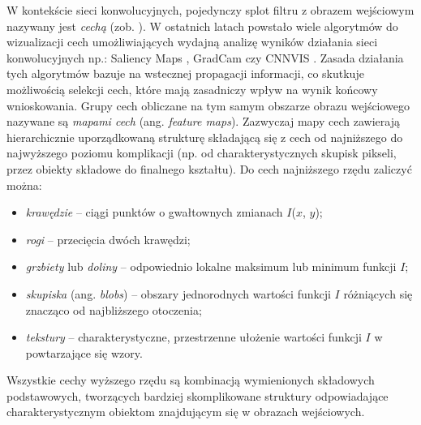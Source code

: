 W kontekście sieci konwolucyjnych, pojedynczy splot filtru z obrazem wejściowym nazywany jest \textit{cechą} (zob. \cite{Hijazi2015}). W ostatnich latach powstało wiele algorytmów do wizualizacji cech umożliwiających wydajną analizę wyników działania sieci konwolucyjnych np.: Saliency Maps \cite{DBLP:journals/corr/SimonyanVZ13}, GradCam \cite{DBLP:journals/corr/SelvarajuDVCPB16} czy CNNVIS \cite{DBLP:journals/corr/LiuSLLZL16}. Zasada działania tych algorytmów bazuje na wstecznej propagacji informacji, co skutkuje możliwością selekcji cech, które mają zasadniczy wpływ na wynik końcowy wnioskowania. Grupy cech obliczane na tym samym obszarze obrazu wejściowego nazywane są \textit{mapami cech} (ang. \textit{feature maps}). Zazwyczaj mapy cech zawierają hierarchicznie uporządkowaną strukturę składającą się z cech od najniższego do najwyższego poziomu komplikacji (np. od charakterystycznych skupisk pikseli, przez obiekty składowe do finalnego kształtu). Do cech najniższego rzędu zaliczyć można:
\begin{itemize}[noitemsep,nolistsep]
	\item \textit{krawędzie} -- ciągi punktów o gwałtownych zmianach $I$($x$, $y$);
	\item \textit{rogi} -- przecięcia dwóch krawędzi;
	\item \textit{grzbiety} lub \textit{doliny} -- odpowiednio lokalne maksimum lub minimum funkcji $I$;
	\item \textit{skupiska} (ang. \textit{blobs}) -- obszary jednorodnych wartości funkcji $I$ różniących się znacząco od najbliższego otoczenia; 
	\item \textit{tekstury} -- charakterystyczne, przestrzenne ułożenie wartości funkcji $I$ w powtarzające się wzory.
\end{itemize}

Wszystkie cechy wyższego rzędu są kombinacją wymienionych składowych podstawowych, tworzących bardziej skomplikowane struktury odpowiadające charakterystycznym obiektom znajdującym się w obrazach wejściowych. 

